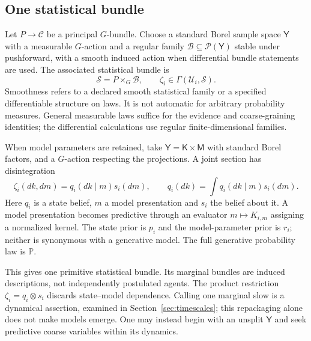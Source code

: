 \subsection{One statistical bundle}\label{sec:statistical_manifolds}
\label{sec:agents_as_sections}\label{sec:local_trivialization}\label{sec:dual_role_rigor}
Let $P\to\mathcal C$ be a principal $G$-bundle. Choose a standard Borel sample space $\mathsf Y$ with a measurable $G$-action and a regular family $\mathcal B\subseteq\mathcal P(\mathsf Y)$ stable under pushforward, with a smooth induced action when differential bundle statements are used. The associated statistical bundle is
\begin{equation}
\mathcal S=P\times_G\mathcal B,\qquad
\zeta_i\in\Gamma(\mathcal U_i,\mathcal S).
\label{eq:single_statistical_bundle}
\end{equation}
Smoothness refers to a declared smooth statistical family or a specified differentiable structure on laws. It is not automatic for arbitrary probability measures. General measurable laws suffice for the evidence and coarse-graining identities; the differential calculations use regular finite-dimensional families.

When model parameters are retained, take $\mathsf Y=\mathsf K\times\mathsf M$ with standard Borel factors, and a $G$-action respecting the projections. A joint section has disintegration
\begin{equation}
\zeta_i(dk,dm)=q_i(dk\mid m)s_i(dm),\qquad
q_i(dk)=\int q_i(dk\mid m)s_i(dm).
\label{eq:joint_agent_disintegration}
\end{equation}
Here $q_i$ is a state belief, $m$ a model presentation and $s_i$ the belief about it. A model presentation becomes predictive through an evaluator $m\mapsto K_{i,m}$ assigning a normalized kernel. The state prior is $p_i$ and the model-parameter prior is $r_i$; neither is synonymous with a generative model. The full generative probability law is $\mathbb P$.

This gives one primitive statistical bundle. Its marginal bundles are induced descriptions, not independently postulated agents. The product restriction $\zeta_i=q_i\otimes s_i$ discards state--model dependence. Calling one marginal slow is a dynamical assertion, examined in Section~\ref{sec:timescales}; this repackaging alone does not make models emerge. One may instead begin with an unsplit $\mathsf Y$ and seek predictive coarse variables within its dynamics.

